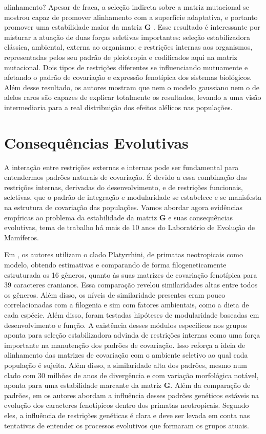 alinhamento? Apesar de fraca, a seleção indireta sobre a matriz
mutacional se mostrou capaz de promover alinhamento com a superfície
adaptativa, e portanto promover uma estabilidade maior da matriz $\mathbf{G}$
\citep{Jones2007}.
Esse resultado é interessante por misturar a atuação de duas forças
seletivas importantes: seleção estabilizadora clássica, ambiental,
externa ao organismo; e restrições internas aos organismos,
representadas pelos seu padrão de pleiotropia e codificados aqui na
matriz mutacional.
Dois tipos de restrições diferentes se influenciando mutuamente e
afetando o padrão de covariação e expressão fenotípica dos sistemas
biológicos.
Além desse resultado, os autores mostram que nem o modelo gaussiano nem
o de alelos raros são capazes de explicar totalmente os resultados,
levando a uma visão intermediaria para a real distribuição dos efeitos
alélicos nas populações.

\section{Consequências Evolutivas}\label{intro:consequencias}

A interação entre restrições externas e internas pode ser fundamental
para entendermos padrões naturais de covariação.
É devido a essa combinação das restrições internas, derivadas do
desenvolvimento, e de restrições funcionais, seletivas, que o padrão de
integração e modularidade se estabelece e se manisfesta na estrutura de
covariação das populações.
Vamos abordar agora evidências empíricas ao problema da estabilidade da
matriz $\mathbf{G}$ e suas consequências evolutivas, tema de trabalho há mais de 10
anos do Laboratório de Evolução de Mamíferos.

Em \cite{Marroig2001}, os autores utilizam o clado Platyrrhini, de
primatas neotropicais como modelo, obtendo estimativas e comparando de
forma filogeneticamente estruturada os 16 gêneros, quanto às suas
matrizes de covariação fenotípica para 39 caracteres cranianos.
Essa comparação revelou similaridades altas entre todos os gêneros.
Além disso, os níveis de similaridade presentes eram pouco
correlacionadas com a filogenia e sim com fatores ambientais, como a
dieta de cada espécie.
Além disso, foram testadas hipóteses de modularidade baseadas em
desenvolvimento e função.
A existência desses módulos específicos nos grupos aponta para
seleção estabilizadora advinda de restrições internas como uma força
importante na manutenção dos padrões de covariação.
Isso reforça a ideia de alinhamento das matrizes de covariação com o
ambiente seletivo ao qual cada população é sujeita.
Além disso, a similaridade alta dos padrões, mesmo num clado com 30
milhões de anos de divergência e com variação morfológica notável,
aponta para uma estabilidade marcante da matriz $\mathbf{G}$.
Além da comparação de padrões, em \cite{Marroig2005, Marroig2010} os
autores abordam a influência desses padrões genéticos estáveis na
evolução dos caracteres fenotípicos dentro dos primatas neotropicais.
Segundo eles, a influência de restrições genéticas é clara e deve ser
levada em conta nas tentativas de entender os processos evolutivos que
formaram os grupos atuais.

